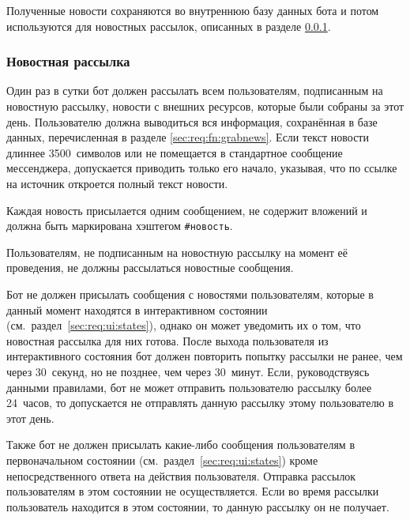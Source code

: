         Полученные новости сохраняются во внутреннюю базу данных бота и потом используются для новостных
        рассылок, описанных в разделе \ref{sec:req:fn:newsletter}.


    \subsubsection{Новостная рассылка}
        \label{sec:req:fn:newsletter}
        Один раз в сутки  бот
        должен рассылать всем пользователям, подписанным на новостную рассылку, новости с внешних
        ресурсов, которые были собраны за этот день. Пользователю
        должна выводиться вся информация, сохранённая в базе данных, перечисленная в разделе
        \ref{sec:req:fn:grabnews}. Если текст новости длиннее 3500~символов или не помещается в
        стандартное сообщение мессенджера, допускается приводить только его начало, указывая,
        что по ссылке на источник откроется полный текст новости.

        Каждая новость присылается одним сообщением, не содержит вложений и
        должна быть маркирована хэштегом \hbox{\texttt{\#новость}}.

        Пользователям, не подписанным на новостную рассылку на момент её проведения, не должны
        рассылаться новостные сообщения.

        Бот не должен присылать сообщения с новостями пользователям, которые в данный момент находятся
        в интерактивном состоянии (см.~раздел~\ref{sec:req:ui:states}),
        однако он может уведомить их о том, что новостная рассылка для них готова.
        После выхода пользователя из интерактивного состояния бот должен повторить попытку
        рассылки не ранее, чем через 30~секунд, но не позднее, чем через 30~минут.
        Если, руководствуясь данными правилами, бот не может отправить пользователю рассылку
        более 24~часов, то допускается не отправлять данную рассылку этому пользователю в этот день.

        Также бот не должен присылать какие-либо сообщения пользователям в первоначальном
        состоянии (см.~раздел~\ref{sec:req:ui:states}) кроме непосредственного ответа на действия
        пользователя. Отправка рассылок пользователям в этом состоянии не осуществляется. Если
        во время рассылки пользователь находится в этом состоянии, то данную рассылку он не получает.

